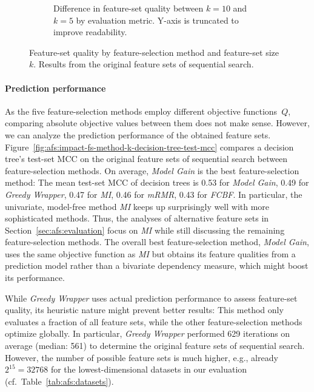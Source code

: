\documentclass{article}
\theoremstyle{definition}
\begin{document}
\begin{figure}[t]
\begin{subfigure}[t]{0.48\textwidth}
		\caption{
			Difference in feature-set quality between $k=10$ and $k=5$ by evaluation metric.
			Y-axis is truncated to improve readability.
		}
		\label{fig:afs:impact-fs-method-k-metric-diff}
	\end{subfigure}
	\caption{
		Feature-set quality by feature-selection method and feature-set size~$k$.
		Results from the original feature sets of sequential search.
	}
	\label{fig:afs:impact-fs-method-k-quality}
\end{figure}

\paragraph{Prediction performance}

As the five feature-selection methods employ different objective functions~$Q$, comparing absolute objective values between them does not make sense.
However, we can analyze the prediction performance of the obtained feature sets.
Figure~\ref{fig:afs:impact-fs-method-k-decision-tree-test-mcc} compares a decision tree's test-set MCC on the original feature sets of sequential search between feature-selection methods.
On average, \emph{Model Gain} is the best feature-selection method:
The mean test-set MCC of decision trees is 0.53 for \emph{Model Gain}, 0.49 for \emph{Greedy Wrapper}, 0.47 for \emph{MI}, 0.46 for \emph{mRMR}, 0.43 for \emph{FCBF}.
In particular, the univariate, model-free method \emph{MI} keeps up surprisingly well with more sophisticated methods.
Thus, the analyses of alternative feature sets in Section~\ref{sec:afs:evaluation} focus on \emph{MI} while still discussing the remaining feature-selection methods.
The overall best feature-selection method, \emph{Model Gain}, uses the same objective function as \emph{MI} but obtains its feature qualities from a prediction model rather than a bivariate dependency measure, which might boost its performance. 

While \emph{Greedy Wrapper} uses actual prediction performance to assess feature-set quality, its heuristic nature might prevent better results:
This method only evaluates a fraction of all feature sets, while the other feature-selection methods optimize globally.
In particular, \emph{Greedy Wrapper} performed 629 iterations on average (median: 561) to determine the original feature sets of sequential search.
However, the number of possible feature sets is much higher, e.g., already $2^{15}=32768$ for the lowest-dimensional datasets in our evaluation (cf.~Table~\ref{tab:afs:datasets}).
\end{document}
